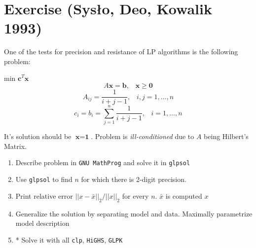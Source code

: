 \section{Exercise (Sysło, Deo, Kowalik 1993)}
One of the tests for precision and resistance of LP algorithms is the following problem: 
\begin{center}
    min $\textbf{c}^T \textbf{x}$ 
    $$A\textbf{x} = \textbf{b}\textrm{,}\quad \textbf{x} \geqslant \textbf{0}$$
    $$A_{ij} = \frac{1}{i+j-1}\textrm{,}\quad i, j = 1,\dots,n$$ 
    $$c_i = b_i = \sum_{j=1}^{n} \frac{1}{i+j-1}\textrm{,}\quad i=1,\dots,n$$
\end{center}
It's solution should be $\textbf{x} = \textbf{1}$. Problem is \textit{ill-conditioned} due to $A$ being Hilbert's Matrix.
\begin{enumerate}
    \item Describe problem in \texttt{GNU MathProg} and solve it in \texttt{glpsol} \notdone
    \item Use \texttt{glpsol} to find $n$ for which there is 2-digit precision. \notdone
    \item Print relative error $||x-\bar{x}||_2 / ||x||_2$ for every $n$. $\bar{x}$ is computed $x$ \notdone
    \item Generalize the solution by separating model and data. Maximally parametrize model description \notdone
    \item * Solve it with all \texttt{clp}, \texttt{HiGHS}, \texttt{GLPK} \neverdone
\end{enumerate}
